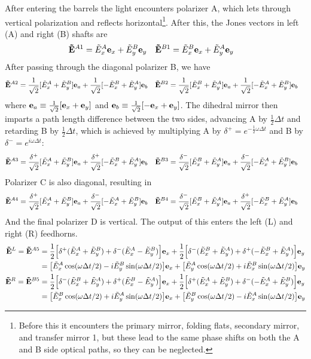 \documentclass{article}
\newcommand{\rtwo}{\frac{1}{\sqrt{2}}}
\newcommand{\rtd}{\frac{\delta^+}{\sqrt{2}}}
\newcommand{\rtc}{\frac{\delta^-}{\sqrt{2}}}
\newcommand{\J}{{\tilde E}}
\renewcommand{\vec}[1]{{\bf #1}}
\begin{document}
After entering the barrels the light encounters polarizer A, which lets through
vertical polarization and reflects horizontal\footnote{
	Before this it encounters the primary mirror, folding flats, secondary mirror,
	and transfer mirror 1, but these lead to the same phase shifts on both
	the A and B side optical paths, so they can be neglected.}. After this,
the Jones vectors in left (A) and right (B) shafts are
\begin{align}
	\vec \J^{A1} &= \J^A_x \vec e_x + \J^B_y \vec e_y &
	\vec \J^{B1} &= \J^B_x \vec e_x + \J^A_y \vec e_y
\end{align}
After passing through the diagonal polarizer B, we have
\begin{align}
	\vec \J^{A2} &= \rtwo [\J^A_x+\J^B_y]\vec e_a + \rtwo[-\J^B_x+\J^A_y]\vec e_b &
	\vec \J^{B2} &= \rtwo [\J^B_x+\J^A_y]\vec e_a + \rtwo[-\J^A_x+\J^B_y]\vec e_b
\end{align}
where $\vec e_a \equiv \rtwo [\vec e_x + \vec e_y]$ and $\vec e_b
\equiv \rtwo [-\vec e_x + \vec e_y]$. The dihedral mirror then
imparts a path length difference between the two sides, advancing
A by $\frac12\Delta t$ and retarding B by $\frac12\Delta t$, which
is achieved by multiplying A by $\delta^+ = e^{-\frac12\omega\Delta t}$
and B by $\delta^- = e^{i\omega\Delta t}$:
\begin{align}
	\vec \J^{A3} &= \rtd [\J^A_x+\J^B_y]\vec e_a + \rtd[-\J^B_x+\J^A_y]\vec e_b &
	\vec \J^{B3} &= \rtc [\J^B_x+\J^A_y]\vec e_a + \rtc[-\J^A_x+\J^B_y]\vec e_b
\end{align}
Polarizer C is also diagonal, resulting in
\begin{align}
	\vec \J^{A4} &= \rtd [\J^A_x+\J^B_y]\vec e_a + \rtc [-\J^A_x+\J^B_y]\vec e_b &
	\vec \J^{B4} &= \rtc [\J^B_x+\J^A_y]\vec e_a + \rtd [-\J^B_x+\J^A_y]\vec e_b
\end{align}
And the final polarizer D is vertical. The output of this enters
the left (L) and right (R) feedhorns.
\begin{align}
	\vec \J^L = \vec \J^{A5} &= \frac12 \Big[\delta^+(\J^A_x+\J^B_y)+\delta^-(\J^A_x-\J^B_y)\Big]\vec e_x
		+ \frac12 \Big[\delta^-(\J^B_x+\J^A_y)+\delta^+(-\J^B_x+\J^A_y)\Big]\vec e_y \notag \\
		&= \big[\J^A_x\cos(\omega\Delta t/2) - i\J^B_y\sin(\omega\Delta t/2)\big]\vec e_x
		+  \big[\J^A_y\cos(\omega\Delta t/2) + i\J^B_x\sin(\omega\Delta t/2)\big]\vec e_y \\
	\vec \J^R = \vec \J^{B5} &= \frac12 \Big[\delta^-(\J^B_x+\J^A_y)+\delta^+(\J^B_x-\J^A_y)\Big]\vec e_x
		+ \frac12 \Big[\delta^+(\J^A_x+\J^B_y)+\delta^-(-\J^A_x+\J^B_y)\Big]\vec e_y \notag \\
		&= \big[\J^B_x\cos(\omega\Delta t/2) + i\J^A_y\sin(\omega\Delta t/2)\big]\vec e_x
		+  \big[\J^B_y\cos(\omega\Delta t/2) - i\J^A_x\sin(\omega\Delta t/2)\big]\vec e_y
\end{align}
\end{document}
